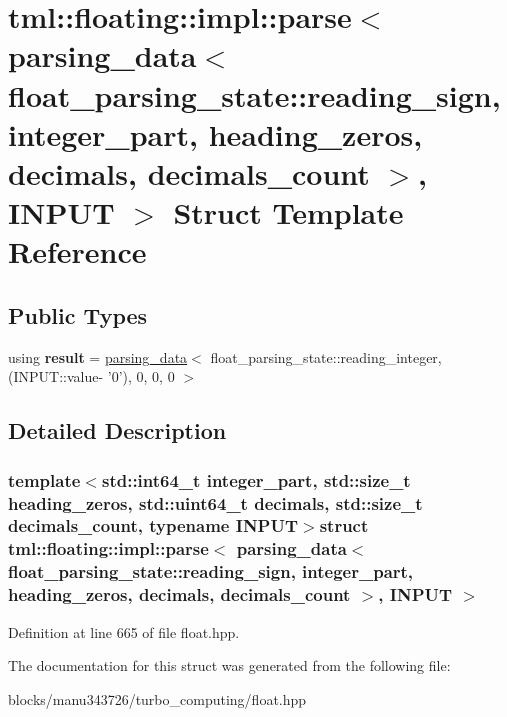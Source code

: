 \hypertarget{structtml_1_1floating_1_1impl_1_1parse_3_01parsing__data_3_01float__parsing__state_1_1reading__s0df746ceb53eb15a98f5d1b3680cea0d}{\section{tml\+:\+:floating\+:\+:impl\+:\+:parse$<$ parsing\+\_\+data$<$ float\+\_\+parsing\+\_\+state\+:\+:reading\+\_\+sign, integer\+\_\+part, heading\+\_\+zeros, decimals, decimals\+\_\+count $>$, I\+N\+P\+U\+T $>$ Struct Template Reference}
\label{structtml_1_1floating_1_1impl_1_1parse_3_01parsing__data_3_01float__parsing__state_1_1reading__s0df746ceb53eb15a98f5d1b3680cea0d}
}
\subsection*{Public Types}
\begin{DoxyCompactItemize}
\item 
\hypertarget{structtml_1_1floating_1_1impl_1_1parse_3_01parsing__data_3_01float__parsing__state_1_1reading__s0df746ceb53eb15a98f5d1b3680cea0d_a0fbe2fe99e88e6fcf7d76364d97b1996}{using {\bfseries result} = \hyperlink{structtml_1_1floating_1_1impl_1_1parsing__data}{parsing\+\_\+data}$<$ float\+\_\+parsing\+\_\+state\+::reading\+\_\+integer,(I\+N\+P\+U\+T\+::value-\/ '0'), 0, 0, 0 $>$}\label{structtml_1_1floating_1_1impl_1_1parse_3_01parsing__data_3_01float__parsing__state_1_1reading__s0df746ceb53eb15a98f5d1b3680cea0d_a0fbe2fe99e88e6fcf7d76364d97b1996}

\end{DoxyCompactItemize}


\subsection{Detailed Description}
\subsubsection*{template$<$std\+::int64\+\_\+t integer\+\_\+part, std\+::size\+\_\+t heading\+\_\+zeros, std\+::uint64\+\_\+t decimals, std\+::size\+\_\+t decimals\+\_\+count, typename I\+N\+P\+U\+T$>$struct tml\+::floating\+::impl\+::parse$<$ parsing\+\_\+data$<$ float\+\_\+parsing\+\_\+state\+::reading\+\_\+sign, integer\+\_\+part, heading\+\_\+zeros, decimals, decimals\+\_\+count $>$, I\+N\+P\+U\+T $>$}



Definition at line 665 of file float.\+hpp.



The documentation for this struct was generated from the following file\+:\begin{DoxyCompactItemize}
\item 
blocks/manu343726/turbo\+\_\+computing/float.\+hpp\end{DoxyCompactItemize}
